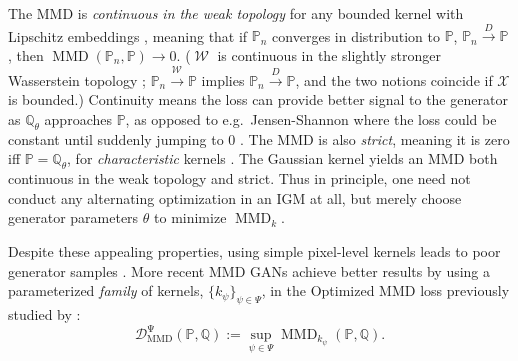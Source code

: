 \documentclass{article}
\newcommand{\distconv}{\xrightarrow{D}}
\newcommand{\wassconv}[1][]{\xrightarrow{{\mathcal W}_{#1}}}
\newcommand{\PP}{\mathbb P}
\newcommand{\QQ}{\mathbb Q}
\DeclareMathOperator{\MMD}{MMD}
\newcommand{\optMMD}[1][\Psi]{\operatorname{\mathcal D_{\mathrm{MMD}}^{#1}}}
\DeclareMathOperator{\W}{\mathcal{W}}
\let\citep\parencite
\begin{document}
The MMD is \emph{continuous in the weak topology}
for any bounded kernel with Lipschitz embeddings \parencite[Theorem 3.2(b)]{opt-est-probabilities},
meaning that if $\PP_n$ converges in distribution to $\PP$, $\PP_n \distconv \PP$, then $\MMD(\PP_n, \PP) \to 0$.
($\W$ is continuous in the slightly stronger Wasserstein topology \citep[Definition 6.9]{Villani:2009};
$\PP_n \wassconv \PP$ implies $\PP_n \distconv \PP$,
and the two notions coincide if $\mathcal X$ is bounded.)
Continuity means the loss can provide better signal to the generator as $\QQ_\theta$ approaches $\PP$,
as opposed to e.g.\ Jensen-Shannon where the loss could be constant until suddenly jumping to 0 \parencite[e.g.][Example 1]{wgan}.
The MMD is also {\em strict}, meaning it is zero iff $\PP=\QQ_\theta$, for \emph{characteristic} kernels \parencite{SriFukLan11}.
The Gaussian kernel yields an MMD both continuous in the weak topology and strict.
Thus in principle, one need not conduct any alternating optimization in an IGM at all,
but merely choose generator parameters $\theta$ to minimize $\MMD_k$.

Despite these appealing properties,
using simple pixel-level kernels leads to poor generator samples \parencite{gen-mmd,gmmn,opt-mmd,Bottou:2017}.
More recent MMD GANs \parencite{mmd-gan,cramer-gan,Binkowski:2018}
achieve better results by using a parameterized \emph{family} of kernels, $\{ k_\psi \}_{\psi \in \Psi}$,
in the Optimized MMD loss
previously studied by \cite{kernel-choice-mmd,opt-est-probabilities}:
\begin{equation}
  \optMMD[\Psi](\PP, \QQ) := \sup_{\psi \in \Psi} \MMD_{k_{\psi}}(\PP, \QQ)
  \label{eq:Optimized_MMD}
.\end{equation}
\end{document}
